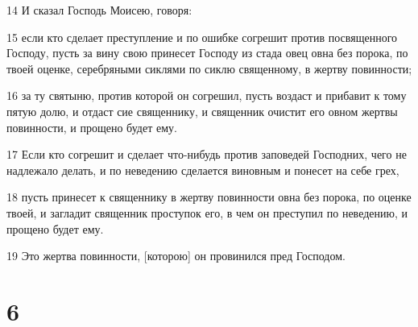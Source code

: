 \par 14 И сказал Господь Моисею, говоря:
\par 15 если кто сделает преступление и по ошибке согрешит против посвященного Господу, пусть за вину свою принесет Господу из стада овец овна без порока, по твоей оценке, серебряными сиклями по сиклю священному, в жертву повинности;
\par 16 за ту святыню, против которой он согрешил, пусть воздаст и прибавит к тому пятую долю, и отдаст сие священнику, и священник очистит его овном жертвы повинности, и прощено будет ему.
\par 17 Если кто согрешит и сделает что-нибудь против заповедей Господних, чего не надлежало делать, и по неведению сделается виновным и понесет на себе грех,
\par 18 пусть принесет к священнику в жертву повинности овна без порока, по оценке твоей, и загладит священник проступок его, в чем он преступил по неведению, и прощено будет ему.
\par 19 Это жертва повинности, [которою] он провинился пред Господом.

\chapter{6}

